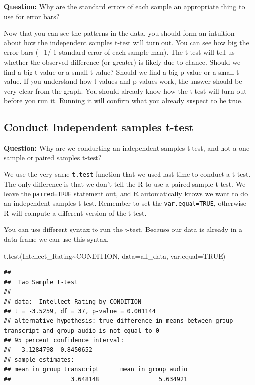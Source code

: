 \documentclass[
]{book}
\newenvironment{Shaded}{\begin{snugshade}}{\end{snugshade}}
\newcommand{\AttributeTok}[1]{\textcolor[rgb]{0.77,0.63,0.00}{#1}}
\newcommand{\ConstantTok}[1]{\textcolor[rgb]{0.00,0.00,0.00}{#1}}
\newcommand{\FunctionTok}[1]{\textcolor[rgb]{0.00,0.00,0.00}{#1}}
\newcommand{\NormalTok}[1]{#1}
\newcommand{\SpecialCharTok}[1]{\textcolor[rgb]{0.00,0.00,0.00}{#1}}
\begin{document}
\textbf{Question:} Why are the standard errors of each sample an appropriate thing to use for error bars?

Now that you can see the patterns in the data, you should form an intuition about how the independent samples t-test will turn out. You can see how big the error bars (+1/-1 standard error of each sample man). The t-test will tell us whether the observed difference (or greater) is likely due to chance. Should we find a big t-value or a small t-value? Should we find a big p-value or a small t-value. If you understand how t-values and p-values work, the answer should be very clear from the graph. You should already know how the t-test will turn out before you run it. Running it will confirm what you already suspect to be true.

\hypertarget{conduct-independent-samples-t-test}{%
\subsection{Conduct Independent samples t-test}\label{conduct-independent-samples-t-test}}

\textbf{Question:} Why are we conducting an independent samples t-test, and not a one-sample or paired samples t-test?

We use the very same \texttt{t.test} function that we used last time to conduct a t-test. The only difference is that we don't tell the R to use a paired sample t-test. We leave the \texttt{paired=TRUE} statement out, and R automatically knows we want to do an independent samples t-test. Remember to set the \texttt{var.equal=TRUE}, otherwise R will compute a different version of the t-test.

You can use different syntax to run the t-test. Because our data is already in a data frame we can use this syntax.

\begin{Shaded}
\begin{Highlighting}[]
\FunctionTok{t.test}\NormalTok{(Intellect\_Rating}\SpecialCharTok{\textasciitilde{}}\NormalTok{CONDITION, }\AttributeTok{data=}\NormalTok{all\_data, }\AttributeTok{var.equal=}\ConstantTok{TRUE}\NormalTok{)}
\end{Highlighting}
\end{Shaded}

\begin{verbatim}
## 
##  Two Sample t-test
## 
## data:  Intellect_Rating by CONDITION
## t = -3.5259, df = 37, p-value = 0.001144
## alternative hypothesis: true difference in means between group transcript and group audio is not equal to 0
## 95 percent confidence interval:
##  -3.1284798 -0.8450652
## sample estimates:
## mean in group transcript      mean in group audio 
##                 3.648148                 5.634921
\end{verbatim}
\end{document}
